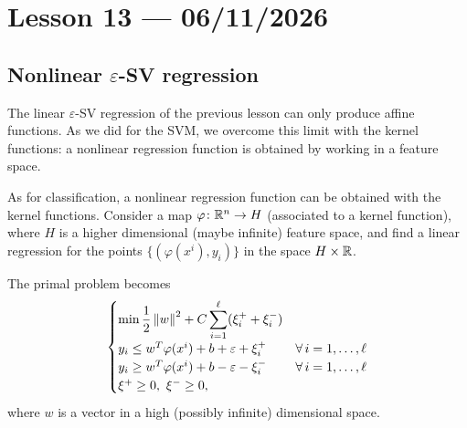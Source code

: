 \section{Lesson 13 --- 06/11/2026}

\subsection{Nonlinear \texorpdfstring{$\varepsilon$}{epsilon}-SV regression}

The linear $\varepsilon$-SV regression of the previous lesson can only produce affine functions. As we did for the SVM, we overcome this limit with the kernel functions: a nonlinear regression function is obtained by working in a feature space.

As for classification, a nonlinear regression function can be obtained with the kernel functions. Consider a map $\varphi \colon \mathbb{R}^n \to H$ (associated to a kernel function), where $H$ is a higher dimensional (maybe infinite) feature space, and find a linear regression for the points $\{(\varphi(x^i), y_i)\}$ in the space $H \times \mathbb{R}$.

The primal problem becomes
\[
\begin{cases}
\displaystyle \min \frac{1}{2}\left\lVert w \right\rVert^2 + C\sum_{i=1}^{\ell}(\xi_i^+ + \xi_i^-)\\[1ex]
y_i \le w^T\varphi(x^i) + b + \varepsilon + \xi_i^+ & \forall\, i=1,\dots,\ell\\
y_i \ge w^T\varphi(x^i) + b - \varepsilon - \xi_i^- & \forall\, i=1,\dots,\ell\\
\xi^+ \ge 0,\ \xi^- \ge 0,
\end{cases}
\]
where $w$ is a vector in a high (possibly infinite) dimensional space.

